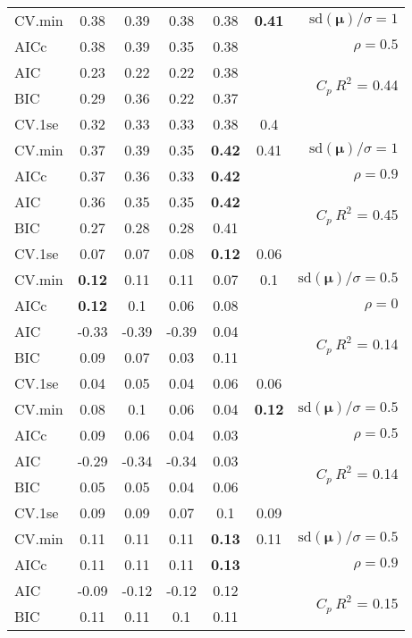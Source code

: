 \documentclass[12pt]{article}
\newcommand{\mr}[1]{\mathrm{#1}}
\newcommand{\bm}[1]{\mathbf{#1}}
\begin{document}
\begin{table}[p]
\begin{center}
\begin{tabular}{l*{5}{c}|r}
CV.min & 0.38 & 0.39 & 0.38 & 0.38 & {\bf 0.41} &  $\mr{sd}(\bm{\mu})/\sigma=1$ \\
AICc & 0.38 & 0.39 & 0.35 & 0.38 & & $\rho=0.5$ \\
AIC & 0.23 & 0.22 & 0.22 & 0.38 & & \multirow{2}{*}{$C_p ~ R^2$ = 0.44} \\
BIC & 0.29 & 0.36 & 0.22 & 0.37 & & \\
 \hline 
CV.1se & 0.32 & 0.33 & 0.33 & 0.38 & 0.4 &\\
CV.min & 0.37 & 0.39 & 0.35 & {\bf 0.42} & 0.41 &  $\mr{sd}(\bm{\mu})/\sigma=1$ \\
AICc & 0.37 & 0.36 & 0.33 & {\bf 0.42} & & $\rho=0.9$ \\
AIC & 0.36 & 0.35 & 0.35 & {\bf 0.42} & & \multirow{2}{*}{$C_p ~ R^2$ = 0.45} \\
BIC & 0.27 & 0.28 & 0.28 & 0.41 & & \\
 \hline 
CV.1se & 0.07 & 0.07 & 0.08 & {\bf 0.12} & 0.06 &\\
CV.min & {\bf 0.12} & 0.11 & 0.11 & 0.07 & 0.1 &  $\mr{sd}(\bm{\mu})/\sigma=0.5$ \\
AICc & {\bf 0.12} & 0.1 & 0.06 & 0.08 & & $\rho=0$ \\
AIC & -0.33 & -0.39 & -0.39 & 0.04 & & \multirow{2}{*}{$C_p ~ R^2$ = 0.14} \\
BIC & 0.09 & 0.07 & 0.03 & 0.11 & & \\
 \hline 
CV.1se & 0.04 & 0.05 & 0.04 & 0.06 & 0.06 &\\
CV.min & 0.08 & 0.1 & 0.06 & 0.04 & {\bf 0.12} &  $\mr{sd}(\bm{\mu})/\sigma=0.5$ \\
AICc & 0.09 & 0.06 & 0.04 & 0.03 & & $\rho=0.5$ \\
AIC & -0.29 & -0.34 & -0.34 & 0.03 & & \multirow{2}{*}{$C_p ~ R^2$ = 0.14} \\
BIC & 0.05 & 0.05 & 0.04 & 0.06 & & \\
 \hline 
CV.1se & 0.09 & 0.09 & 0.07 & 0.1 & 0.09 &\\
CV.min & 0.11 & 0.11 & 0.11 & {\bf 0.13} & 0.11 &  $\mr{sd}(\bm{\mu})/\sigma=0.5$ \\
AICc & 0.11 & 0.11 & 0.11 & {\bf 0.13} & & $\rho=0.9$ \\
AIC & -0.09 & -0.12 & -0.12 & 0.12 & & \multirow{2}{*}{$C_p ~ R^2$ = 0.15} \\
BIC & 0.11 & 0.11 & 0.1 & 0.11 & & \\
 \hline 
\end{tabular}
\end{center}
\vspace{-1cm}
\end{table}
\end{document}
